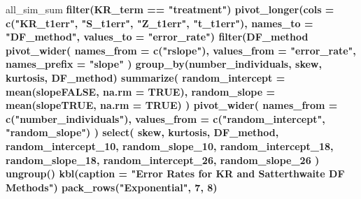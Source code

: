 \documentclass[12pt, twoside]{amherstthesis}
\newenvironment{Shaded}{\begin{snugshade}}{\end{snugshade}}
\newcommand{\DataTypeTok}[1]{\textcolor[rgb]{0.13,0.29,0.53}{#1}}
\newcommand{\DecValTok}[1]{\textcolor[rgb]{0.00,0.00,0.81}{#1}}
\newcommand{\KeywordTok}[1]{\textcolor[rgb]{0.13,0.29,0.53}{\textbf{#1}}}
\newcommand{\NormalTok}[1]{#1}
\newcommand{\OperatorTok}[1]{\textcolor[rgb]{0.81,0.36,0.00}{\textbf{#1}}}
\newcommand{\OtherTok}[1]{\textcolor[rgb]{0.56,0.35,0.01}{#1}}
\newcommand{\StringTok}[1]{\textcolor[rgb]{0.31,0.60,0.02}{#1}}
\begin{document}
\begin{Shaded}
\begin{Highlighting}[]
{{{{{{{{{{{{{{{{{{{{{{{{{{{{{{{{{{{{{{{{{{{{{{{{{{{{{{\NormalTok{all_sim_sum }\OperatorTok{%>%}
\StringTok{  }\KeywordTok{filter}\NormalTok{(KR_term }\OperatorTok{==}\StringTok{ "treatment"}\NormalTok{) }\OperatorTok{%>%}
\StringTok{  }\KeywordTok{pivot_longer}\NormalTok{(}\DataTypeTok{cols =} \KeywordTok{c}\NormalTok{(}\StringTok{"KR_t1err"}\NormalTok{, }\StringTok{"S_t1err"}\NormalTok{, }\StringTok{"Z_t1err"}\NormalTok{, }\StringTok{"t_t1err"}\NormalTok{), }
               \DataTypeTok{names_to =} \StringTok{"DF_method"}\NormalTok{, }\DataTypeTok{values_to =} \StringTok{"error_rate"}\NormalTok{) }\OperatorTok{%>%}
\StringTok{  }\KeywordTok{filter}\NormalTok{(DF_method }\OperatorTok{%in%}\StringTok{ }\KeywordTok{c}\NormalTok{(}\StringTok{"KR_t1err"}\NormalTok{, }\StringTok{"S_t1err"}\NormalTok{)) }\OperatorTok{%>%}
\StringTok{  }\KeywordTok{pivot_wider}\NormalTok{(}
    \DataTypeTok{names_from =} \KeywordTok{c}\NormalTok{(}\StringTok{"rslope"}\NormalTok{),}
    \DataTypeTok{values_from =} \StringTok{"error_rate"}\NormalTok{, }\DataTypeTok{names_prefix =} \StringTok{"slope"}
\NormalTok{  ) }\OperatorTok{%>%}
\StringTok{  }\KeywordTok{group_by}\NormalTok{(number_individuals, skew, kurtosis, DF_method) }\OperatorTok{%>%}
\StringTok{  }\KeywordTok{summarize}\NormalTok{(}
    \DataTypeTok{random_intercept =} \KeywordTok{mean}\NormalTok{(slopeFALSE, }\DataTypeTok{na.rm =} \OtherTok{TRUE}\NormalTok{),}
    \DataTypeTok{random_slope =} \KeywordTok{mean}\NormalTok{(slopeTRUE, }\DataTypeTok{na.rm =} \OtherTok{TRUE}\NormalTok{)}
\NormalTok{  ) }\OperatorTok{%>%}
\StringTok{  }\KeywordTok{pivot_wider}\NormalTok{(}
    \DataTypeTok{names_from =} \KeywordTok{c}\NormalTok{(}\StringTok{"number_individuals"}\NormalTok{),}
    \DataTypeTok{values_from =} \KeywordTok{c}\NormalTok{(}\StringTok{"random_intercept"}\NormalTok{, }\StringTok{"random_slope"}\NormalTok{)}
\NormalTok{  ) }\OperatorTok{%>%}
\StringTok{  }\KeywordTok{select}\NormalTok{(}
\NormalTok{    skew, kurtosis, DF_method, random_intercept_}\DecValTok{10}\NormalTok{, random_slope_}\DecValTok{10}\NormalTok{, }
\NormalTok{    random_intercept_}\DecValTok{18}\NormalTok{,}
\NormalTok{    random_slope_}\DecValTok{18}\NormalTok{, random_intercept_}\DecValTok{26}\NormalTok{, random_slope_}\DecValTok{26}
\NormalTok{  ) }\OperatorTok{%>%}
\StringTok{  }\KeywordTok{ungroup}\NormalTok{() }\OperatorTok{%>%}
\StringTok{  }\KeywordTok{kbl}\NormalTok{(}\DataTypeTok{caption =} \StringTok{"Error Rates for KR and Satterthwaite DF Methods"}\NormalTok{) }\OperatorTok{%>%}
\StringTok{  }\KeywordTok{pack_rows}\NormalTok{(}\StringTok{"Exponential"}\NormalTok{, }\DecValTok{7}\NormalTok{, }\DecValTok{8}\NormalTok{) }\OperatorTok{%>%}
}}}}}}}}}}}}}}}}}}}}}}}}}}}}}}}}}}}}}}}}}}}}}}}}}}}}}}}}}}}}}}}}}}
\end{Highlighting}
\end{Shaded}
\end{document}
